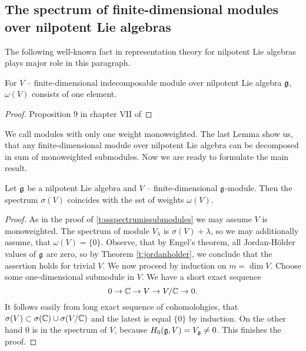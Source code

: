 \subsection{The spectrum of finite-dimensional modules over nilpotent Lie algebras}
The following well-known fact in representation theory for nilpotent Lie algebras plays major role
in this paragraph.
\begin{lemma} \label{l:nilpdecomp}
    For $V$ -- finite-dimensional indecomposable module over nilpotent Lie algebra $\mathfrak{g}$,
    $\omega(V)$ consists of one element.
\end{lemma}
\begin{proof}
    Proposition 9 in chapter VII of 
\end{proof}
We call modules with only one weight monoweighted. The last Lemma show us, that any
finite-dimensional module over nilpotent Lie algebra can be decomposed in sum of monoweighted
submodules.  Now we are ready to formulate the main result.
\begin{theorem}
    Let $\mathfrak{g}$ be a nilpotent Lie algebra and $V$ -- finite-dimensional $\mathfrak{g}$-module. Then the
    spectrum $\sigma(V)$ coincides with the set of weights $\omega(V)$.
\end{theorem}
\begin{proof}
    As in the proof of \ref{t:ssspectrumissubmodules} we may assume $V$ is monoweighted. The
    spectrum of module $V_{\lambda}$ is $\sigma(V) + \lambda$, so we may additionally assume, that
    $\omega(V) = \{0\}$. Observe, that by Engel's theorem, all Jordan-H{\"o}lder values of $\mathfrak{g}$
    are zero, so by Theorem \ref{t:jordanholder}, we conclude that the assertion holds for trivial
    $V$. We now proceed by induction on $m = \dim V$. Choose some one-dimensional submodule in $V$.
    We have a short exact sequence
    \[
        0\to \mathbb{C} \to V \to V/\mathbb{C} \to 0.
    \]
    It follows easily from long exact sequence of cohomolohgies, that $\sigma(V) \subset
    \sigma(\mathbb{C}) \cup \sigma(V/\mathbb{C})$ and the latest is equal $\{0\}$ by induction. On the other hand
    $0$ is in the spectrum of $V$, because $H_0(\mathfrak{g}, V) = V_{\mathfrak{g}} \neq 0$. This finishes the
    proof.
\end{proof}
